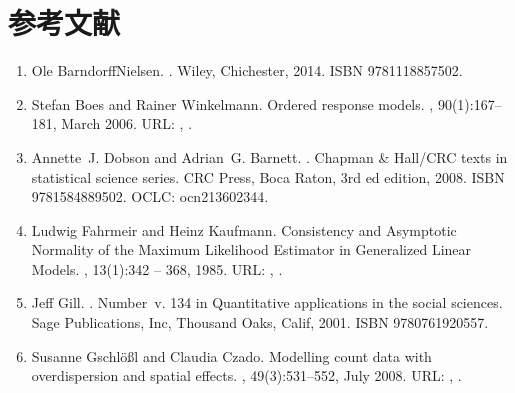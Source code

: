 \documentclass[letterpaper,10pt,english]{sphinxmanual}
\begin{document}
\chapter{参考文献}
\label{\detokenize{_u53c2_u8003_u6587_u732e/content:id1}}\label{\detokenize{_u53c2_u8003_u6587_u732e/content::doc}}\begin{enumerate}
%
\setcounter{enumi}{0}
\item {} 
Ole Barndorff\sphinxhyphen{}Nielsen. . Wiley, Chichester, 2014. ISBN 9781118857502.

\item {} 
Stefan Boes and Rainer Winkelmann. Ordered response models. , 90(1):167–181, March 2006. URL: , .

\item {} 
Annette J. Dobson and Adrian G. Barnett. . Chapman \& Hall/CRC texts in statistical science series. CRC Press, Boca Raton, 3rd ed edition, 2008. ISBN 9781584889502. OCLC: ocn213602344.

\item {} 
Ludwig Fahrmeir and Heinz Kaufmann. Consistency and Asymptotic Normality of the Maximum Likelihood Estimator in Generalized Linear Models. , 13(1):342 – 368, 1985. URL: , .

\item {} 
Jeff Gill. . Number v. 134 in Quantitative applications in the social sciences. Sage Publications, Inc, Thousand Oaks, Calif, 2001. ISBN 9780761920557.

\item {} 
Susanne Gschlößl and Claudia Czado. Modelling count data with overdispersion and spatial effects. , 49(3):531–552, July 2008. URL: , .


\end{enumerate}
\end{document}
